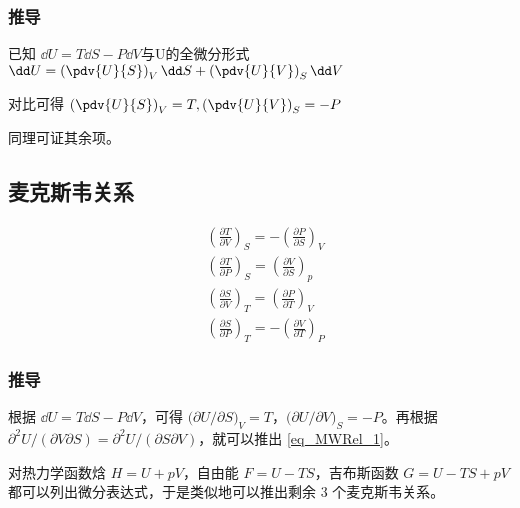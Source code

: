 \subsubsection{推导}
已知 $\dd U = T \dd S - P \dd V$与U的全微分形式 $\dd U = \left(\pdv{U}{S}\right)_V \dd S+\left(\pdv{U}{V}\right)_S \dd V$

对比可得 $\left(\pdv{U}{S}\right)_V=T, \left(\pdv{U}{V}\right)_S=-P$

同理可证其余项。

\subsection{麦克斯韦关系}

\begin{align}
&\left(\frac{\partial T}{\partial V}\right)_S=-\left(\frac{\partial P}{\partial S}\right)_V\label{eq_MWRel_1}
\\
&\left(\frac{\partial T}{\partial P}\right)_S=\left(\frac{\partial V}{\partial S}\right)_p
\\
&\left(\frac{\partial S}{\partial V}\right)_T=\left(\frac{\partial P}{\partial T}\right)_V
\\
&\left(\frac{\partial S}{\partial P}\right)_T=-\left(\frac{\partial V}{\partial T}\right)_P
\end{align}

\subsubsection{推导}
根据 $\dd U=T\dd S-P\dd V$，可得 $\Big(\partial U/\partial S\Big)_V=T$，$\Big(\partial U/\partial V\Big)_S=-P$。再根据 $\partial^2 U/(\partial V\partial S)=\partial^2 U/(\partial S\partial V)$，就可以推出 \autoref{eq_MWRel_1}。

对热力学函数焓 $H=U+pV$，自由能 $F=U-TS$，吉布斯函数 $G=U-TS+pV$ 都可以列出微分表达式，于是类似地可以推出剩余 $3$ 个麦克斯韦关系。

